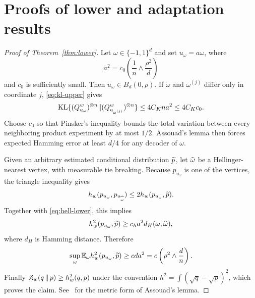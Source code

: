 \section{Proofs of lower and adaptation results}
\label{app:lower-proofs}

\begin{proof}[Proof of Theorem~\ref{thm:lower}]
Let \(\omega\in\{-1,1\}^d\) and set \(u_\omega=a\omega\), where
\[
a^2=c_0\left(\frac1n\wedge\frac{\rho^2}{d}\right)
\]
and \(c_0\) is sufficiently small. Then \(u_\omega\in B_d(0,\rho)\). If \(\omega\) and \(\omega^{(j)}\) differ only in coordinate \(j\), \cref{eq:kl-upper} gives
\[
\operatorname{KL}\{(Q_{u_\omega}^w)^{\otimes n}\|
        (Q_{u_{\omega^{(j)}}}^w)^{\otimes n}\}
\le 4C_Kna^2\le4C_Kc_0.
\]
Choose \(c_0\) so that Pinsker's inequality bounds the total variation between every neighboring product experiment by at most \(1/2\). Assouad's lemma then forces expected Hamming error at least \(d/4\) for any decoder of \(\omega\).

Given an arbitrary estimated conditional distribution \(\widetilde p\), let
\(\widehat\omega\) be a Hellinger-nearest vertex, with measurable tie breaking.
Because \(p_{u_\omega}\) is one of the vertices, the triangle inequality gives
\[
h_w(p_{u_\omega},p_{u_{\widehat\omega}})
\le 2h_w(p_{u_\omega},\widetilde p).
\]
Together with \cref{eq:hell-lower}, this implies
\[
h_w^2(p_{u_\omega},\widetilde p)
\ge c_h a^2d_H(\omega,\widehat\omega),
\]
where \(d_H\) is Hamming distance. Therefore
\[
\sup_\omega\mathbb E_\omega h_w^2(p_{u_\omega},\widetilde p)
\ge c d a^2
=c\left(\rho^2\wedge\frac dn\right).
\]
Finally \(\mathfrak K_w\!\left(q\,\middle\|\,p\right)\ge h_w^2(q,p)\) under the convention
\(h^2=\int(\sqrt q-\sqrt p)^2\), which proves the claim. See~\citet{tsybakov2009} for the metric form of Assouad's lemma.
\end{proof}

